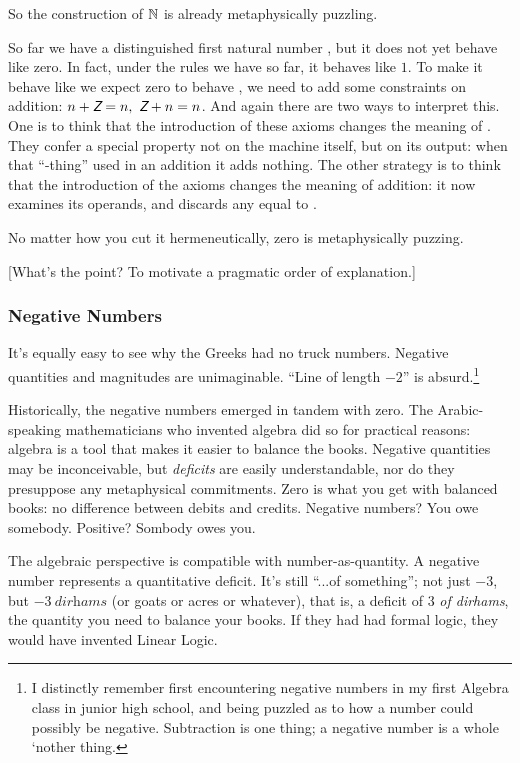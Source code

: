 \documentclass{article}
\begin{document}
So the construction of \(\mathbb{N}\) is already metaphysically puzzling.

So far we have a distinguished first natural number \Znat, but it does
not yet behave like zero. In fact, under the rules we have so far, it
behaves like \(1\). To make it behave like we expect zero to behave ,
we need to add some constraints on addition: \(n + \Znat = n,\ \Znat +
n = n\). And again there are two ways to interpret this. One is to
think that the introduction of these axioms changes the meaning of
\Znat. They confer a special property not on the \Znat machine itself,
but on its output: when that ``\Znat-thing'' used in an addition it
adds nothing. The other strategy is to think that the introduction of
the axioms changes the meaning of addition: it now examines its
operands, and discards any equal to \Znat.

No matter how you cut it hermeneutically, zero is metaphysically
puzzing.

[What's the point? To motivate a pragmatic order of explanation.]

\subsubsection{Negative Numbers}

It's equally easy to see why the Greeks had no truck numbers. Negative
quantities and magnitudes are unimaginable. ``Line of length \(-2\)''
is absurd.\footnote{I distinctly remember first encountering negative
numbers in my first Algebra class in junior high school, and being
puzzled as to how a number could possibly be negative. Subtraction is
one thing; a negative number is a whole `nother thing.}

Historically, the negative numbers emerged in tandem with zero. The
Arabic-speaking mathematicians who invented algebra did so for
practical reasons: algebra is a tool that makes it easier to balance
the books. Negative quantities may be inconceivable, but
\textit{deficits} are easily understandable, nor do they presuppose
any metaphysical commitments. Zero is what you get with balanced
books: no difference between debits and credits. Negative numbers? You
owe somebody. Positive? Sombody owes you.

The algebraic perspective is compatible with number-as-quantity. A
negative number represents a quantitative deficit. It's still ``...of
something''; not just \(-3\), but \(-3\ \textit{dirhams}\) (or goats
or acres or whatever), that is, a deficit of \(3\) \textit{of
  dirhams}, the quantity you need to balance your books. If they had had
formal logic, they would have invented Linear Logic.
\end{document}
